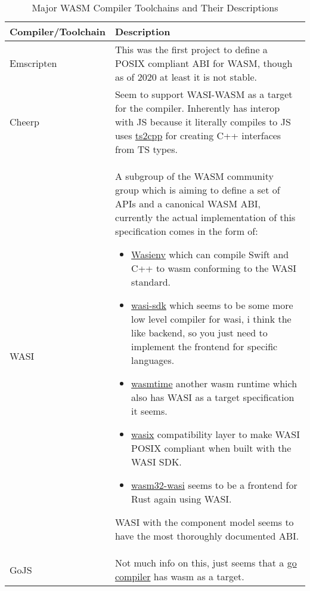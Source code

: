 \begin{table*}[ht!]
\centering
\begin{tabular}{|l|p{15cm}|}
\hline
\textbf{Compiler/Toolchain} & \textbf{Description} \\ \hline
Emscripten & This was the first project to define a POSIX compliant ABI for WASM, though as of 2020 at least it is not stable. \\ \hline
Cheerp & Seem to support WASI-WASM as a target for the compiler. Inherently has interop with JS because it literally compiles to JS uses \href{https://github.com/leaningtech/ts2cpp/}{ts2cpp} for creating C++ interfaces from TS types. \\ \hline
WASI & A subgroup of the WASM community group which is aiming to define a set of APIs and a canonical WASM ABI, currently the actual implementation of this specification comes in the form of:
\begin{itemize}
    \item \href{https://github.com/wasienv/wasienv}{Wasienv}\cite{Akbary2023wasienv} which can compile Swift and C++ to wasm conforming to the WASI standard.
    \item \href{https://github.com/WebAssembly/wasi-sdk}{wasi-sdk}\cite{Gohman2024WebAssembly} which seems to be some more low level compiler for wasi, i think the like backend, so you just need to implement the frontend for specific languages.
    \item \href{https://wasmtime.dev/}{wasmtime}\cite{wasmtime_intro} another wasm runtime which also has WASI as a target specification it seems.
    \item \href{https://github.com/singlestore-labs/wasix}{wasix}\cite{wasix} compatibility layer to make WASI POSIX compliant when built with the WASI SDK.
    \item \href{https://github.com/bytecodealliance/cargo-wasi}{wasm32-wasi}\cite{cargo-wasi} seems to be a frontend for Rust again using WASI.
\end{itemize}
WASI with the component model seems to have the most thoroughly documented ABI. \\ \hline
GoJS & Not much info on this, just seems that a \href{https://tinygo.org/}{go compiler}\cite{Ayke2024tinygo} has wasm as a target. \\ \hline
\end{tabular}
\caption{Major WASM Compiler Toolchains and Their Descriptions}
\label{table:wasm_compilers}
\end{table*}

